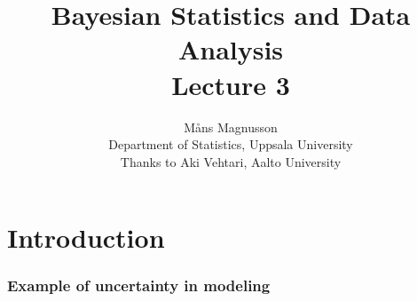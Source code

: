 \documentclass[10pt,handout]{beamer}
\title[]{{\color{black}Bayesian Statistics and Data Analysis \\ Lecture 3}}
\author[]{M{\aa}ns Magnusson \\ Department of Statistics, Uppsala University \\ Thanks to Aki Vehtari, Aalto University}
\date{}
\begin{document}
\frame{\titlepage
}



\section{Introduction}
\frame{\sectionpage}

\begin{frame}

\frametitle{Example of uncertainty in modeling}



\end{frame}
\end{document}

